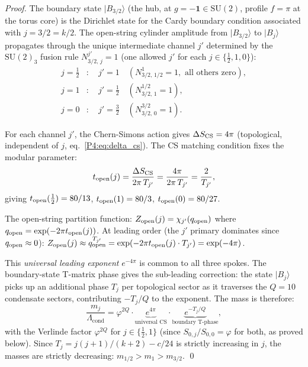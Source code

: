 \documentclass[11pt,a4paper]{article}
\theoremstyle{definition}
\theoremstyle{remark}
\newcommand{\vp}{\varphi}
\newcommand{\Lcond}{\Lambda_{\mathrm{cond}}}
\begin{document}
\begin{proof}
The boundary state $|B_{3/2}\rangle$ (the hub, at $g=-\mathbf{1}\in\mathrm{SU}(2)$,
profile $f=\pi$ at the torus core) is the Dirichlet state for the Cardy boundary
condition associated with $j=3/2 = k/2$.
The open-string cylinder amplitude from $|B_{3/2}\rangle$ to $|B_j\rangle$
propagates through the unique intermediate channel $j'$ determined by the
$\mathrm{SU}(2)_3$ fusion rule $N^{j'}_{3/2,\,j} = 1$ (one allowed $j'$ for
each $j\in\{\tfrac{1}{2},1,0\}$):
\begin{align}
  j = \tfrac{1}{2} &: \quad j' = 1 \quad
    (N^1_{3/2,\,1/2}=1,\text{ all others zero}),
    \label{P4:eq:channel_12} \\
  j = 1 &: \quad j' = \tfrac{1}{2} \quad
    (N^{1/2}_{3/2,\,1}=1),
    \label{P4:eq:channel_1} \\
  j = 0 &: \quad j' = \tfrac{3}{2} \quad
    (N^{3/2}_{3/2,\,0}=1).
    \label{P4:eq:channel_0}
\end{align}

For each channel $j'$, the Chern-Simons action gives
$\Delta S_{\rm CS} = 4\pi$ (topological, independent of $j$,
eq.~\eqref{P4:eq:delta_cs}).
The CS matching condition fixes the modular parameter:
\begin{equation}
  t_{\rm open}(j)
  = \frac{\Delta S_{\rm CS}}{2\pi\, T_{j'}}
  = \frac{4\pi}{2\pi\, T_{j'}}
  = \frac{2}{T_{j'}},
  \label{P4:eq:topen_j}
\end{equation}
giving $t_{\rm open}(\tfrac{1}{2}) = 80/13$,
$t_{\rm open}(1) = 80/3$, $t_{\rm open}(0) = 80/27$.

The open-string partition function:
$Z_{\rm open}(j) = \chi_{j'}(q_{\rm open})$ where
$q_{\rm open} = \exp(-2\pi t_{\rm open}(j))$.
At leading order (the $j'$ primary dominates since
$q_{\rm open} \approx 0$):
$Z_{\rm open}(j) \approx q_{\rm open}^{T_{j'}}
= \exp(-2\pi t_{\rm open}(j)\cdot T_{j'})
= \exp(-4\pi)$.

This \emph{universal leading exponent} $e^{-4\pi}$ is common to all three
spokes.
The boundary-state T-matrix phase gives the sub-leading correction:
the state $|B_j\rangle$ picks up an additional phase $T_j$ per topological
sector as it traverses the $Q=10$ condensate sectors, contributing
$-T_j/Q$ to the exponent.
The mass is therefore:
\begin{equation}
  \frac{m_j}{\Lcond}
  = \vp^{2Q}\cdot
    \underbrace{e^{4\pi}}_{\text{universal CS}}
    \cdot\underbrace{e^{-T_j/Q}}_{\text{boundary T-phase}},
\end{equation}
with the Verlinde factor $\vp^{2Q}$ for $j\in\{\tfrac{1}{2},1\}$
(since $S_{0,j}/S_{0,0} = \vp$ for both, as proved below).
Since $T_j = j(j+1)/(k+2) - c/24$ is strictly increasing in $j$, the
masses are strictly decreasing: $m_{1/2}>m_1>m_{3/2}$.
\qed
\end{proof}
\end{document}
